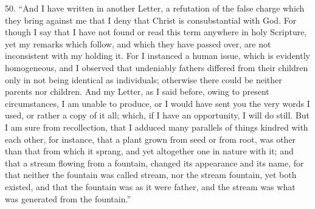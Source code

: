 50. ``And I have written in
another Letter, a refutation of the false charge which they bring
against me that I deny that Christ is consubstantial with God. For
though I say that I have not found or read this term anywhere in holy
Scripture, yet my remarks which follow, and which they have passed
over, are not inconsistent with my holding it. For I instanced a human
issue, which is evidently homogeneous, and I observed that undeniably
fathers differed from their children only in not being identical as
individuals; otherwise there could be neither parents nor children.
And my Letter, as I said before, owing to present circumstances, I am
unable to produce, or I would have sent you the very words I used, or
rather a copy of it all; which, if I have an opportunity, I will do
still. But I am sure from recollection, that I adduced many parallels
of things kindred with each other, for instance, that a plant grown
from seed or from root, was other than that from which it sprang, and
yet altogether one in nature with it; and that a stream flowing from a
fountain, changed its appearance and its name, for that neither the
fountain was called stream, nor the stream fountain, yet both existed,
and that the fountain was as it were father, and the stream was what
was generated from the fountain.''

